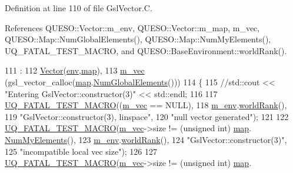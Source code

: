 Definition at line 110 of file Gsl\-Vector.\-C.



References Q\-U\-E\-S\-O\-::\-Vector\-::m\-\_\-env, Q\-U\-E\-S\-O\-::\-Vector\-::m\-\_\-map, m\-\_\-vec, Q\-U\-E\-S\-O\-::\-Map\-::\-Num\-Global\-Elements(), Q\-U\-E\-S\-O\-::\-Map\-::\-Num\-My\-Elements(), U\-Q\-\_\-\-F\-A\-T\-A\-L\-\_\-\-T\-E\-S\-T\-\_\-\-M\-A\-C\-R\-O, and Q\-U\-E\-S\-O\-::\-Base\-Environment\-::world\-Rank().


\begin{DoxyCode}
111   :
112   \hyperlink{class_q_u_e_s_o_1_1_vector_aff103391923777d30d67f3d89706278b}{Vector}(\hyperlink{class_q_u_e_s_o_1_1_vector_a2e2952dab0554fedd8dc9a2543715745}{env},\hyperlink{class_q_u_e_s_o_1_1_vector_a0cbedc1f6e24c0ad3b688d201fd649a4}{map}),
113   \hyperlink{class_q_u_e_s_o_1_1_gsl_vector_a503dd126017b7ac587ff511e8d0d833b}{m\_vec}        (gsl\_vector\_calloc(\hyperlink{class_q_u_e_s_o_1_1_vector_a0cbedc1f6e24c0ad3b688d201fd649a4}{map}.\hyperlink{class_q_u_e_s_o_1_1_map_ac67907266dcd7108ffe5a0cbef908781}{NumGlobalElements}()))
114 \{
115   \textcolor{comment}{//std::cout << "Entering GslVector::constructor(3)" << std::endl;}
116 
117   \hyperlink{_defines_8h_a56d63d18d0a6d45757de47fcc06f574d}{UQ\_FATAL\_TEST\_MACRO}((\hyperlink{class_q_u_e_s_o_1_1_gsl_vector_a503dd126017b7ac587ff511e8d0d833b}{m\_vec} == NULL),
118                       \hyperlink{class_q_u_e_s_o_1_1_vector_ae7615172bb1e54339151d3f3d71a0344}{m\_env}.\hyperlink{class_q_u_e_s_o_1_1_base_environment_a78b57112bbd0e6dd0e8afec00b40ffa7}{worldRank}(),
119                       \textcolor{stringliteral}{"GslVector::constructor(3), linspace"},
120                       \textcolor{stringliteral}{"null vector generated"});
121 
122   \hyperlink{_defines_8h_a56d63d18d0a6d45757de47fcc06f574d}{UQ\_FATAL\_TEST\_MACRO}(\hyperlink{class_q_u_e_s_o_1_1_gsl_vector_a503dd126017b7ac587ff511e8d0d833b}{m\_vec}->size != (\textcolor{keywordtype}{unsigned} \textcolor{keywordtype}{int}) \hyperlink{class_q_u_e_s_o_1_1_vector_a0cbedc1f6e24c0ad3b688d201fd649a4}{map}.
      \hyperlink{class_q_u_e_s_o_1_1_map_a6407f6d6a6df8a0a40923c8dc524b021}{NumMyElements}(),
123                       \hyperlink{class_q_u_e_s_o_1_1_vector_ae7615172bb1e54339151d3f3d71a0344}{m\_env}.\hyperlink{class_q_u_e_s_o_1_1_base_environment_a78b57112bbd0e6dd0e8afec00b40ffa7}{worldRank}(),
124                       \textcolor{stringliteral}{"GslVector::constructor(3)"},
125                       \textcolor{stringliteral}{"incompatible local vec size"});
126 
127   \hyperlink{_defines_8h_a56d63d18d0a6d45757de47fcc06f574d}{UQ\_FATAL\_TEST\_MACRO}(\hyperlink{class_q_u_e_s_o_1_1_gsl_vector_a503dd126017b7ac587ff511e8d0d833b}{m\_vec}->size != (\textcolor{keywordtype}{unsigned} \textcolor{keywordtype}{int}) \hyperlink{class_q_u_e_s_o_1_1_vector_a0cbedc1f6e24c0ad3b688d201fd649a4}{map}.

\end{DoxyCode}
